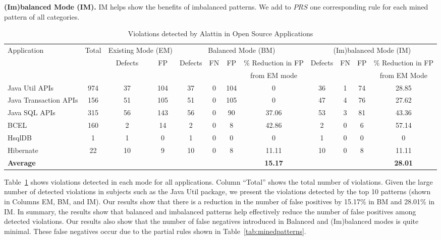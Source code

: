 \textbf{(Im)balanced Mode (IM).} IM helps show the benefits of imbalanced patterns. We add to $PRS$ one corresponding rule for each mined pattern of all categories.
 
\setlength{\tabcolsep}{1pt}
\begin{table}[t]
\begin{SmallOut}
\begin{CodeOut}
\begin{center}
\centering \caption {\label{tab:detectedviolations} Violations detected by Alattin in Open Source Applications}
\begin {tabular} {|l|c|c|c|c|c|c|c|c|c|c|c|}
\hline
Application&Total&\multicolumn{2}{|c|}{Existing Mode (EM)}&\multicolumn{4}{|c|}{Balanced Mode (BM)}&\multicolumn{4}{|c|}{(Im)balanced Mode (IM)}\\
\cline{3-12}
&&Defects&FP&Defects&FN&FP&\% Reduction in FP&Defects&FN&FP&\% Reduction in FP\\
&&&&&&& from EM mode&&&& from EM Mode\\
\hline
\hline Java Util APIs& 974 & 37 & 104 & 37 & 0 & 104 & 0 & 36 & 1 & 74 & 28.85\\
\hline Java Transaction APIs& 156 & 51 & 105 & 51 & 0 & 105 & 0 & 47 & 4 & 76 & 27.62\\
\hline Java SQL APIs& 315 & 56 & 143 & 56 & 0 & 90 & 37.06 & 53 & 3 & 81 & 43.36\\
\hline BCEL& 160 & 2 & 14 & 2 & 0 & 8 & 42.86 & 2 & 0 & 6 & 57.14\\
\hline HsqlDB& 1 & 1 & 0 & 1 & 0 & 0 & 0 & 1 & 0 & 0 & 0\\
\hline Hibernate& 22 & 10 & 9 & 10 & 0 & 8 & 11.11 & 10 & 0 & 8 & 11.11\\
\hline
\hline \textbf{Average} & & & & & & & \textbf{15.17} & & & & \textbf{28.01}\\ 
\hline
\end{tabular}\vspace*{-3ex}
\end{center}
\end{CodeOut}
\end{SmallOut}
\end{table}

Table~\ref{tab:detectedviolations} shows violations detected in each mode for all applications. Column ``Total'' shows the total number of violations. Given the large number of detected violations in subjects such as the Java Util package, we present the violations detected by the top 10 patterns (shown in Columns EM, BM, and IM). Our results show that there is a reduction in the number of false positives by 15.17\% in BM and 28.01\% in IM. In summary, the results show that balanced and imbalanced patterns help effectively reduce the number of false positives among detected violations. Our results also show that the number of false negatives introduced in Balanced and (Im)balanced modes is quite minimal. These false negatives occur due to the partial rules shown in Table~\ref{tab:minedpatterns}. 

